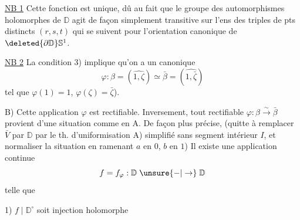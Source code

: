 \uline{NB 1} Cette fonction est unique, dû au fait
que  le groupe des automorphismes 
holomorphes de $\mathbb D$ agit de façon simplement
transitive sur l'ens des
triples  de pts distincts $(r,s,t)$  qui se
suivent pour l'orientation canonique de
$\deleted{\partial\mathbb D}\mathbb S^1$. 

\uline{NB 2} La condition 3) implique qu'on a un
 canonique
\[
\varphi:\beta=(\widehat{1,\zeta})\simeq\bar\beta=(\widehat{1,\bar\zeta})
\]
tel que $\varphi(1)=1$, $\varphi(\zeta)=\bar\zeta$).

B) Cette application $\varphi$ est rectifiable. Inversement,
 tout   rectifiable $\varphi:\beta\xrightarrow{\sim}\bar\beta$
provient d'une situation comme en A.
De façon plus précise, 
(quitte à remplacer $\bar V$ par $\mathbb D$ par le th. d'uniformisation A)
simplifié sans segment intérieur $I$,
et normaliser la situation en  ramenant
$a$ en $0$, $b$ en $1$)  Il existe
une application continue
\[
f=f_\varphi:\mathbb D\mathrel{\unsure{-|\to}}\mathbb D
\]
telle que

1) $f\mid\mathbb D^\circ$ soit  injection holomorphe
